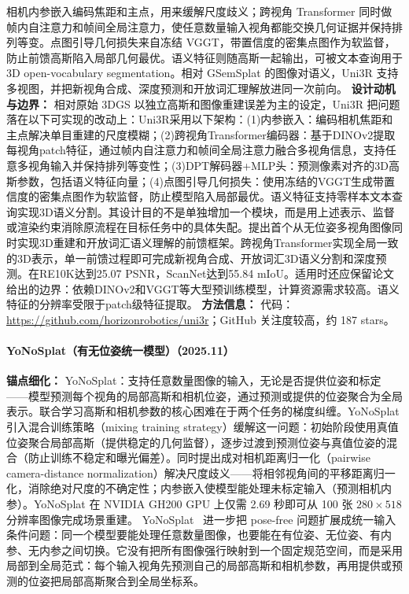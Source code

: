 相机内参嵌入编码焦距和主点，用来缓解尺度歧义；跨视角 Transformer 同时做帧内自注意力和帧间全局注意力，使任意数量输入视角都能交换几何证据并保持排列等变。点图引导几何损失来自冻结 VGGT，带置信度的密集点图作为软监督，防止前馈高斯陷入局部几何最优。语义特征则随高斯一起输出，可被文本查询用于 3D open-vocabulary segmentation。相对 GSemSplat 的图像对语义，Uni3R 支持多视图，并把新视角合成、深度预测和开放词汇理解放进同一次前向。
\textbf{设计动机与边界：} 相对原始 3DGS 以独立高斯和图像重建误差为主的设定，Uni3R 把问题落在以下可实现的改动上：Uni3R采用以下架构：(1)内参嵌入：编码相机焦距和主点解决单目重建的尺度模糊；(2)跨视角Transformer编码器：基于DINOv2提取每视角patch特征，通过帧内自注意力和帧间全局注意力融合多视角信息，支持任意多视角输入并保持排列等变性；(3)DPT解码器+MLP头：预测像素对齐的3D高斯参数，包括语义特征向量；(4)点图引导几何损失：使用冻结的VGGT生成带置信度的密集点图作为软监督，防止模型陷入局部最优。语义特征支持零样本文本查询实现3D语义分割。其设计目的不是单独增加一个模块，而是用上述表示、监督或渲染约束消除原流程在目标任务中的具体失配。提出首个从无位姿多视角图像同时实现3D重建和开放词汇语义理解的前馈框架。跨视角Transformer实现全局一致的3D表示，单一前馈过程即可完成新视角合成、开放词汇3D语义分割和深度预测。在RE10K达到25.07 PSNR，ScanNet达到55.84 mIoU。适用时还应保留论文给出的边界：依赖DINOv2和VGGT等大型预训练模型，计算资源需求较高。语义特征的分辨率受限于patch级特征提取。
\textbf{方法信息：} 代码：\url{https://github.com/horizonrobotics/uni3r}；GitHub 关注度较高，约 187 stars。



\paragraph{YoNoSplat（有无位姿统一模型）（2025.11）}
\textbf{锚点细化：} YoNoSplat：支持任意数量图像的输入，无论是否提供位姿和标定——模型预测每个视角的局部高斯和相机位姿，通过预测或提供的位姿聚合为全局表示。联合学习高斯和相机参数的核心困难在于两个任务的梯度纠缠。YoNoSplat 引入混合训练策略（mixing training strategy）缓解这一问题：初始阶段使用真值位姿聚合局部高斯（提供稳定的几何监督），逐步过渡到预测位姿与真值位姿的混合（防止训练不稳定和曝光偏差）。同时提出成对相机距离归一化（pairwise camera-distance normalization）解决尺度歧义——将相邻视角间的平移距离归一化，消除绝对尺度的不确定性；内参嵌入使模型能处理未标定输入（预测相机内参）。YoNoSplat 在 NVIDIA GH200 GPU 上仅需 2.69 秒即可从 100 张 $280 \times 518$ 分辨率图像完成场景重建。
YoNoSplat~\cite{2511_07321} 进一步把 pose-free 问题扩展成统一输入条件问题：同一个模型要能处理任意数量图像，也要能在有位姿、无位姿、有内参、无内参之间切换。它没有把所有图像强行映射到一个固定规范空间，而是采用局部到全局范式：每个输入视角先预测自己的局部高斯和相机参数，再用提供或预测的位姿把局部高斯聚合到全局坐标系。


